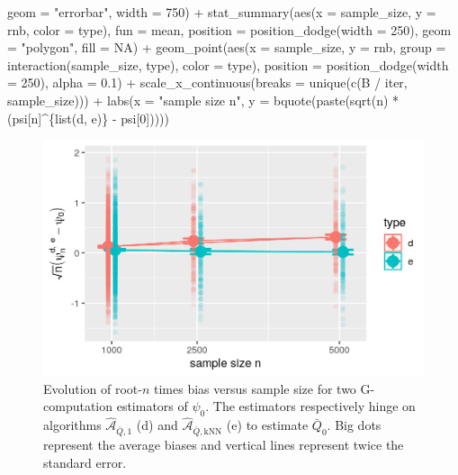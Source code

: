\documentclass[
  11pt,
  openright,twoside]{book}
\newenvironment{Shaded}{\begin{snugshade}}{\end{snugshade}}
\newcommand{\AttributeTok}[1]{\textcolor[rgb]{0.77,0.63,0.00}{#1}}
\newcommand{\ConstantTok}[1]{\textcolor[rgb]{0.00,0.00,0.00}{#1}}
\newcommand{\DecValTok}[1]{\textcolor[rgb]{0.00,0.00,0.81}{#1}}
\newcommand{\FloatTok}[1]{\textcolor[rgb]{0.00,0.00,0.81}{#1}}
\newcommand{\FunctionTok}[1]{\textcolor[rgb]{0.00,0.00,0.00}{#1}}
\newcommand{\NormalTok}[1]{#1}
\newcommand{\SpecialCharTok}[1]{\textcolor[rgb]{0.00,0.00,0.00}{#1}}
\newcommand{\StringTok}[1]{\textcolor[rgb]{0.31,0.60,0.02}{#1}}
\newcommand{\Algo}{\widehat{\mathcal{A}}}
\newcommand{\Qbar}{\bar{Q}}
\theoremstyle{definition}
\theoremstyle{definition}
\theoremstyle{definition}
\theoremstyle{definition}
\theoremstyle{remark}
\begin{document}
\begin{Shaded}
\begin{Highlighting}[]
               \AttributeTok{geom =} \StringTok{"errorbar"}\NormalTok{, }\AttributeTok{width =} \DecValTok{750}\NormalTok{) }\SpecialCharTok{+}
  \FunctionTok{stat\_summary}\NormalTok{(}\FunctionTok{aes}\NormalTok{(}\AttributeTok{x =}\NormalTok{ sample\_size, }\AttributeTok{y =}\NormalTok{ rnb,}
                   \AttributeTok{color =}\NormalTok{ type),}
               \AttributeTok{fun =}\NormalTok{ mean,}
               \AttributeTok{position =} \FunctionTok{position\_dodge}\NormalTok{(}\AttributeTok{width =} \DecValTok{250}\NormalTok{),}
               \AttributeTok{geom =} \StringTok{"polygon"}\NormalTok{, }\AttributeTok{fill =} \ConstantTok{NA}\NormalTok{) }\SpecialCharTok{+}
  \FunctionTok{geom\_point}\NormalTok{(}\FunctionTok{aes}\NormalTok{(}\AttributeTok{x =}\NormalTok{ sample\_size, }\AttributeTok{y =}\NormalTok{ rnb,}
                 \AttributeTok{group =} \FunctionTok{interaction}\NormalTok{(sample\_size, type),}
                 \AttributeTok{color =}\NormalTok{ type),}
             \AttributeTok{position =} \FunctionTok{position\_dodge}\NormalTok{(}\AttributeTok{width =} \DecValTok{250}\NormalTok{),}
             \AttributeTok{alpha =} \FloatTok{0.1}\NormalTok{) }\SpecialCharTok{+}
  \FunctionTok{scale\_x\_continuous}\NormalTok{(}\AttributeTok{breaks =} \FunctionTok{unique}\NormalTok{(}\FunctionTok{c}\NormalTok{(B }\SpecialCharTok{/}\NormalTok{ iter, sample\_size))) }\SpecialCharTok{+}
  \FunctionTok{labs}\NormalTok{(}\AttributeTok{x =} \StringTok{"sample size n"}\NormalTok{,}
       \AttributeTok{y =} \FunctionTok{bquote}\NormalTok{(}\FunctionTok{paste}\NormalTok{(}\FunctionTok{sqrt}\NormalTok{(n) }\SpecialCharTok{*}\NormalTok{ (psi[n]}\SpecialCharTok{\^{}}\NormalTok{\{}\FunctionTok{list}\NormalTok{(d, e)\} }\SpecialCharTok{{-}}\NormalTok{ psi[}\DecValTok{0}\NormalTok{]))))}
\end{Highlighting}
\end{Shaded}

\begin{figure}

{\centering \includegraphics[width=0.7\linewidth]{img/estimating-Qbar-four-1} 

}

\caption{Evolution of root-\(n\) times bias versus sample size for two G-computation estimators of \(\psi_{0}\). The estimators respectively hinge on algorithms \(\Algo_{\Qbar,1}\) (d) and \(\Algo_{\Qbar,\text{kNN}}\) (e) to estimate \(\Qbar_{0}\). Big dots represent the average biases and vertical lines represent twice the standard error.}\label{fig:estimating-Qbar-four}
\end{figure}
\end{document}
